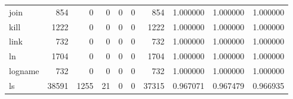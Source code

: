 \begin{longtable}{lrrrrrrrrr}
join      &                                                854 &                                                  0 &                                                  0 &                                                  0 &                                                  0 &                                                854 &                                           1.000000 &                               1.000000 &                             1.000000 \\
kill      &                                               1222 &                                                  0 &                                                  0 &                                                  0 &                                                  0 &                                               1222 &                                           1.000000 &                               1.000000 &                             1.000000 \\
link      &                                                732 &                                                  0 &                                                  0 &                                                  0 &                                                  0 &                                                732 &                                           1.000000 &                               1.000000 &                             1.000000 \\
ln        &                                               1704 &                                                  0 &                                                  0 &                                                  0 &                                                  0 &                                               1704 &                                           1.000000 &                               1.000000 &                             1.000000 \\
logname   &                                                732 &                                                  0 &                                                  0 &                                                  0 &                                                  0 &                                                732 &                                           1.000000 &                               1.000000 &                             1.000000 \\
ls        &                                              38591 &                                               1255 &                                                 21 &                                                  0 &                                                  0 &                                              37315 &                                           0.967071 &                               0.967479 &                             0.966935 \\

\end{longtable}

